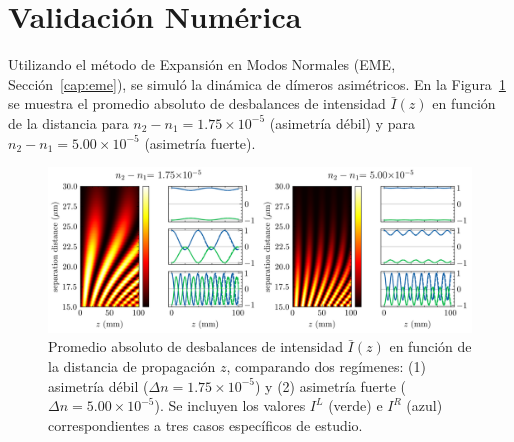 \section{Validación Numérica}

Utilizando el método de Expansión en Modos Normales (EME, Sección~\ref{cap:eme}), se simuló la dinámica de dímeros asimétricos. En la Figura~\ref{fig:nonotrho-num} se muestra el promedio absoluto de desbalances de intensidad $\bar{I}(z)$ en función de la distancia para $n_2 - n_1 = 1.75 \times 10^{-5}$ (asimetría débil) y para $n_2 - n_1 = 5.00 \times 10^{-5}$ (asimetría fuerte).

\begin{figure}[H]
	\centering
	\includegraphics[width=\linewidth]{media/imbalance-nonortho.png}
	\caption[Promedio absoluto de desbalances de intensidad $\bar{I}(z)$ en función de la distancia de propagación $z$]{Promedio absoluto de desbalances de intensidad $\bar{I}(z)$ en función de la distancia de propagación $z$, comparando dos regímenes: (1) asimetría débil ($\Delta n = 1.75 \times 10^{-5}$) y (2) asimetría fuerte ($\Delta n = 5.00 \times 10^{-5}$). Se incluyen los valores $I^L$ (verde) e $I^R$ (azul) correspondientes a tres casos específicos de estudio.}
	\label{fig:nonotrho-num}
\end{figure}
